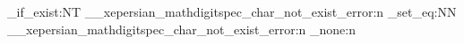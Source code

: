 %

\def\thesisLatinTextScale{0.90}
\def\thesisMonoScale{0.80}

\ExplSyntaxOn
\cs_if_exist:NT \__xepersian_mathdigitspec_char_not_exist_error:n
  { \cs_set_eq:NN \__xepersian_mathdigitspec_char_not_exist_error:n \use_none:n }
\ExplSyntaxOff

\makeatletter

